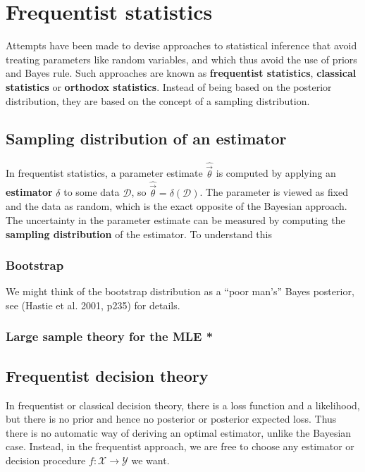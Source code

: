 \chapter{Frequentist statistics}

Attempts have been made to devise approaches to statistical inference that avoid treating parameters like random variables, and which thus avoid the use of priors and Bayes rule. Such approaches are known as \textbf{frequentist statistics}, \textbf{classical statistics} or \textbf{orthodox statistics}. Instead of being based on the posterior distribution, they are based on the concept of a sampling distribution.


\section{Sampling distribution of an estimator}
In frequentist statistics, a parameter estimate $\hat{\vec{\theta}}$ is computed by applying an \textbf{estimator} $\delta$ to some data $\mathcal{D}$, so $\hat{\vec{\theta}}=\delta(\mathcal{D})$. The parameter is viewed as fixed and the data as random, which is the exact opposite of the Bayesian approach. The uncertainty in the parameter estimate can be measured by computing the \textbf{sampling distribution} of the estimator. To understand this


\subsection{Bootstrap}
We might think of the bootstrap distribution as a “poor man’s” Bayes posterior, see (Hastie et al. 2001, p235) for details.


\subsection{Large sample theory for the MLE *}



\section{Frequentist decision theory}
In frequentist or classical decision theory, there is a loss function and a likelihood, but there is no prior and hence no posterior or posterior expected loss. Thus there is no automatic way of deriving an optimal estimator, unlike the Bayesian case. Instead, in the frequentist approach, we are free to choose any estimator or decision procedure $f: \mathcal{X} \rightarrow \mathcal{Y}$ we want.

